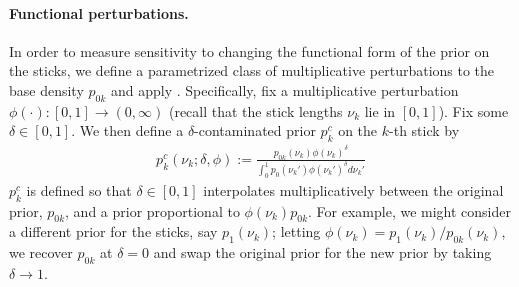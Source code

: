 

\paragraph{Functional perturbations.}
%
In order to measure sensitivity to changing the functional form of the prior on
the sticks, we define a parametrized class of multiplicative perturbations to
the base density $p_{0k}$ and apply .
Specifically, fix a multiplicative perturbation $\phi(\cdot): [0, 1] \rightarrow
(0, \infty)$ (recall that the stick lengths $\nu_k$  lie in $[0, 1]$). Fix some
$\delta\in[0, 1]$.  We then define a $\delta$-contaminated prior $p^c_{k}$ on
the $k$-th stick by
%
\begin{align}
\label{eq:expon_perturb}
	p^c_{k}(\nu_k ; \delta, \phi) :=
  \frac{p_{0k}(\nu_k)\phi(\nu_k)^\delta}
       {\int_0^1 p_0(\nu_k')\phi(\nu_k')^\delta d\nu_k'}
\end{align}
%
$p^c_{k}$ is defined so that $\delta\in[0, 1]$ interpolates multiplicatively
between the original prior, $p_{0k}$, and a prior proportional to
$\phi(\nu_k)p_{0k}$. For example, we might consider a different prior for the
sticks, say $p_1(\nu_k)$; letting $\phi(\nu_k) = p_1(\nu_k) / p_{0k}(\nu_k)$, we
recover $p_{0k}$ at $\delta = 0$ and swap the original prior for the new prior
by taking $\delta \rightarrow 1$.

